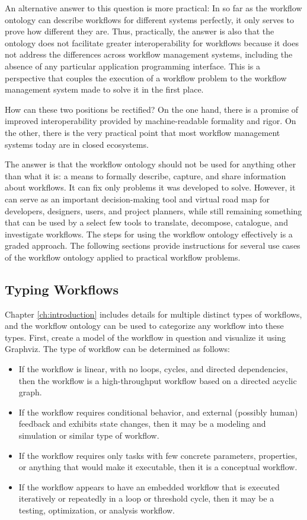 An alternative answer to this question is more practical: In so far as the
workflow ontology can describe workflows for different systems perfectly, it
only serves to prove how different they are. Thus, practically, the answer is
also that the ontology does not facilitate greater interoperability for
workflows because it does not address the differences across workflow
management systems, including the absence of any particular application
programming interface. This is a perspective that couples the execution of a
workflow problem to the workflow management system made to solve it in the
first place.

How can these two positions be rectified? On the one hand, there is a promise of
improved interoperability provided by machine-readable formality and rigor. On
the other, there is the very practical point that most workflow management
systems today are in closed ecosystems.

The answer is that the workflow ontology should not be used for anything other
than what it is: a means to formally describe, capture, and share information
about workflows. It can fix only problems it was developed to solve. However, it
can serve as an important decision-making tool and virtual road map for
developers, designers, users, and project planners, while still remaining
something that can be used by a select few tools to translate, decompose,
catalogue, and investigate workflows. The steps for using the workflow ontology
effectively is a graded approach. The following sections provide instructions
for several use cases of the workflow ontology applied to practical workflow
problems.

\subsection{Typing Workflows}

Chapter \ref{ch:introduction} includes details for multiple distinct types of
workflows, and the workflow ontology can be used to categorize any workflow into
these types. First, create a model of the workflow in question and visualize it
using Graphviz. The type of workflow can be determined as follows:
\begin{itemize}
  \item If the workflow is linear, with no loops, cycles, and directed
  dependencies, then the workflow is a high-throughput workflow based on a
  directed acyclic graph.
  \item If the workflow requires conditional behavior, and external (possibly
  human) feedback and exhibits state changes, then it may be a
  modeling and simulation or similar type of workflow.
  \item If the workflow requires only tasks with few concrete parameters,
  properties, or anything that would make it executable, then it is a conceptual
  workflow.
  \item If the workflow appears to have an embedded workflow that is executed
  iteratively or repeatedly in a loop or threshold cycle, then it may be a
  testing, optimization, or analysis workflow.
\end{itemize}

